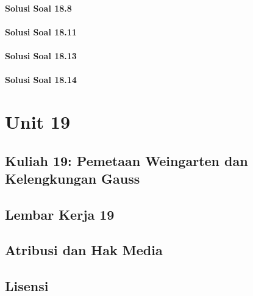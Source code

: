 \documentclass[11pt,a4paper,oneside]{book}
\begin{document}
\subsection*{Solusi Soal 18.8}

\subsection*{Solusi Soal 18.11}

\subsection*{Solusi Soal 18.13}

\subsection*{Solusi Soal 18.14}


\part{Unit 19}
\chapter[Kuliah 19]{Kuliah 19: Pemetaan Weingarten dan Kelengkungan Gauss}


\chapter{Lembar Kerja 19}


\backmatter
\listoffigures
\chapter*{Atribusi dan Hak Media}



















\chapter*{Lisensi}
\Lizenztext
\end{document}
